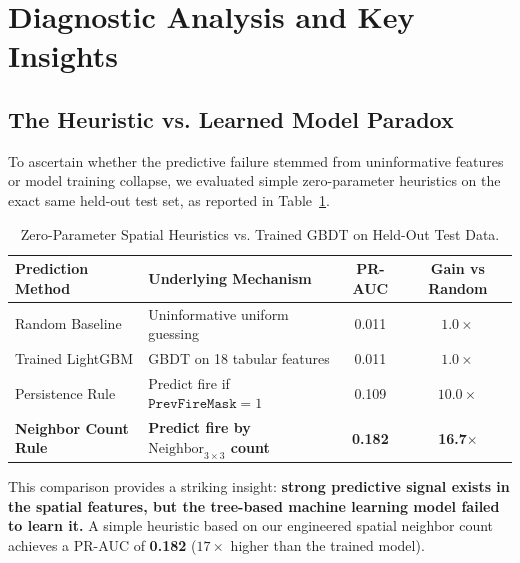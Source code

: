 \documentclass[10pt,journal,compsoc]{IEEEtran}
\begin{document}
\section{Diagnostic Analysis and Key Insights}

\subsection{The Heuristic vs. Learned Model Paradox}
To ascertain whether the predictive failure stemmed from uninformative features or model training collapse, we evaluated simple zero-parameter heuristics on the exact same held-out test set, as reported in Table~\ref{tab:heuristics}.

\begin{table}[H]
\centering
\caption{Zero-Parameter Spatial Heuristics vs. Trained GBDT on Held-Out Test Data.}
\label{tab:heuristics}
\begin{tabularx}{\columnwidth}{lXcc}
\toprule
\textbf{Prediction Method} & \textbf{Underlying Mechanism} & \textbf{PR-AUC} & \textbf{Gain vs Random} \\
\midrule
Random Baseline & Uninformative uniform guessing & 0.011 & $1.0\times$ \\
Trained LightGBM & GBDT on 18 tabular features & 0.011 & $1.0\times$ \\
Persistence Rule & Predict fire if $\texttt{PrevFireMask}=1$ & 0.109 & $10.0\times$ \\
\textbf{Neighbor Count Rule} & \textbf{Predict fire by $\text{Neighbor}_{3\times 3}$ count} & \textbf{0.182} & \textbf{16.7}$\times$ \\
\bottomrule
\end{tabularx}
\end{table}

This comparison provides a striking insight: \textbf{strong predictive signal exists in the spatial features, but the tree-based machine learning model failed to learn it.} A simple heuristic based on our engineered spatial neighbor count achieves a PR-AUC of \textbf{0.182} ($17\times$ higher than the trained model).
\end{document}
